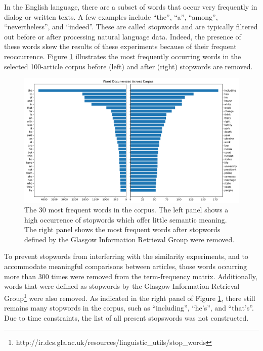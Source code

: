 \documentclass[11pt]{article}
\begin{document}
In the English language, there are a subset of words that occur very frequently in dialog or written texts.
A few examples include ``the'', ``a'', ``among'', ``nevertheless'', and ``indeed''.
These are called stopwords and are typically filtered out before or after processing natural language data.
Indeed, the presence of these words skew the results of these experiments because of their frequent reoccurrence.
Figure \ref{fig:stopwords} illustrates the most frequently occurring words in the selected 100-article corpus before (left) and after (right) stopwords are removed.

\begin{figure}[h] \label{fig:stopwords}
  \centering
  \includegraphics[width=\textwidth]{figures/stopwords}
  \caption{The 30 most frequent words in the corpus. The left panel shows a high occurrence of stopwords which offer little semantic meaning. The right panel shows the most frequent words after stopwords defined by the Glasgow Information Retrieval Group were removed.}
\end{figure}

To prevent stopwords from interferring with the similarity experiments, and to accommodate meaningful comparisons between articles, those words occurring more than 300 times were removed from the term-frequency matrix.
Additionally, words that were defined as stopwords by the Glasgow Information
Retrieval Group\footnote{http://ir.dcs.gla.ac.uk/resources/linguistic\_utils/stop\_words} were also removed.
As indicated in the right panel of Figure \ref{fig:stopwords}, there still remains many stopwords in the corpus, such as ``including'', ``he's'', and ``that's''.
Due to time constraints, the list of all present stopswords was not constructed.
\end{document}
